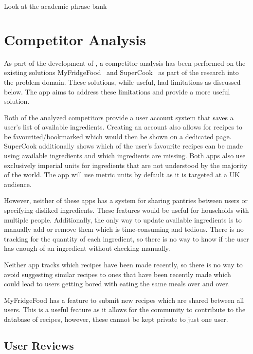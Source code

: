 {    Look at the academic phrase bank
}

\section{Competitor Analysis}\label{sec:competitor_analysis}
As part of the development of \chef{}, a competitor analysis has been performed on the existing solutions
MyFridgeFood~\cite{myfridgefood_myfridgefood_nodate} and SuperCook~\cite{supercook_supercook_nodate} as part of the research
into the problem domain. These solutions, while useful, had limitations as discussed below. The \chef{} app aims to address
these limitations and provide a more useful solution.

Both of the analyzed competitors provide a user account system
that saves a user's list of available ingredients. Creating an account also allows for recipes to be favourited/bookmarked
which would then be shown on a dedicated page. SuperCook additionally shows which of the user's favourite recipes
can be made using available ingredients and which ingredients are missing. Both apps also use exclusively imperial
units for ingredients that are not understood by the majority of the world. The \chef{} app will use metric units by default
as it is targeted at a UK audience.

However, neither of these apps has a system for sharing pantries between users or specifying disliked ingredients. These features would be useful for households with multiple people.
Additionally, the only way to update available ingredients is to manually add or remove them which is time-consuming and tedious. There is no tracking for the quantity of
each ingredient, so there is no way to know if the user has enough of an ingredient without checking manually.

Neither app tracks which recipes have been made recently, so there is no way to avoid suggesting similar recipes to ones that have been recently made which could lead to
users getting bored with eating the same meals over and over.

MyFridgeFood has a feature to submit new recipes which are shared between all users. This is a useful feature as it allows for the community to contribute to the database
of recipes, however, these cannot be kept private to just one user.

\subsection{User Reviews}

